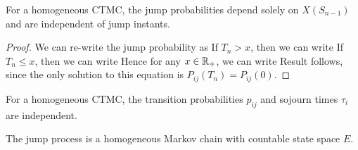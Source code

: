\documentclass[a4paper,10pt,english]{article}
\begin{document}
\begin{lem}
\label{Lemma:JumpProb}
For a homogeneous CTMC, the jump probabilities depend solely on $X(S_{n-1})$ and are independent of jump instants.  
\end{lem}
\begin{proof}
We can re-write the jump probability as
If $T_n > x$, then we can write
If $T_n \leq x$, then we can write 
Hence for any $x \in \mathbb{R}_+$, we can write
Result follows, since the only solution to this equation is $P_{ij}(T_n) = P_{ij}(0)$. 
\end{proof}
\begin{cor} 
For a homogeneous CTMC, the transition probabilities $p_{ij}$ and sojourn times $\tau_i$ are independent. 
\end{cor}
\begin{cor}
The jump process is a homogeneous Markov chain with countable state space $E$. 
\end{cor}

\end{document}
